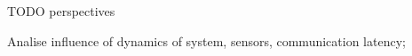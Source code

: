 \documentclass[eprint]{actapoly}
\begin{document}


TODO perspectives

Analise influence of dynamics of system, sensors, communication latency;



\end{document}

